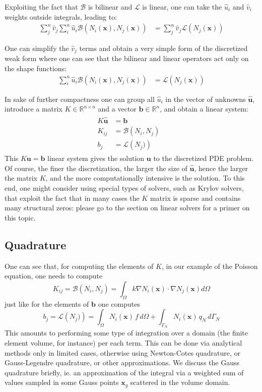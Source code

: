 \documentclass{digitaldynamics}
\def\vect#1{\bm{#1}}
\def\matr#1{{#1}}
\begin{document}
Exploiting the fact that $\mathcal{B}$ is bilinear and $\mathcal{L}$ is linear, one can take the $\hat{u}_i$ and $\hat{v}_i$ weights outside integrals, leading to:
\begin{align}
\sum_j^n \hat{v}_j \sum_i^n \hat{u}_i \mathcal{B}\left(N_i(\vect{x}),N_j(\vect{x})\right) &= \sum_j^n \hat{v}_j \mathcal{L}\left( N_j(\vect{x})\right)
\end{align}

One can simplify the $\hat{v}_j$ terms and obtain a very simple form of the discretized weak form where one can see that the bilinear and linear operators act only on the shape functions:
\begin{align}
\sum_i^n \hat{u}_i \mathcal{B}\left(N_i(\vect{x}),N_j(\vect{x})\right) &= \mathcal{L}\left( N_j(\vect{x})\right)
\end{align}

In sake of further compactness one can group all $\hat{u}_i$ in the vector of unknowns $\hat{\vect{u}}$, introduce a matrix $\matr{K} \in \mathbb{R}^{n\times n}$ and a vector $\vect{b} \in \mathbb{R}^{n}$, and obtain a linear system: 
\begin{align}
\boxed{
\begin{aligned}
\matr{K} \hat{\vect{u}}  &= \vect{b} & \\[2mm]
 K_{ij}   &=  \mathcal{B}\left(N_i,N_j \right) \\
 b_j &=  \mathcal{L}\left( N_j )\right)
\end{aligned}
}
\end{align}
This $\matr{K} \vect{u} = \vect{b}$ linear system gives the solution $\vect{u}$ to the discretized PDE problem. Of course, the finer the discretization, the larger the size of $\hat{\vect{u}}$, hence the larger the matrix $\matr{K}$, and the more computationally intensive is the solution. To this end, one might consider using special types of solvers, such as Krylov solvers, that exploit the fact that in many cases the $\matr{K}$ matrix is sparse and contains many structural zeros: please go to the section on linear solvers for a primer on this topic. 


\subsection{Quadrature}

One can see that, for computing the elements of $\matr{K}$, in our example of the Poisson equation, one needs to compute 
\[
K_{ij}  = \mathcal{B}\left(N_i,N_j \right) = \int_\Omega k \nabla N_i(\vect{x}) \cdot \nabla N_j(\vect{x}) d\Omega
\]
just like for the elements of $\vect{b}$ one computes
\[
b_j  = \mathcal{L}\left( N_j )\right) = \int_\Omega N_i(\vect{x}) \, f \,d\Omega + \int_{\Gamma_N} N_i(\vect{x}) \, q_N \,d\Gamma_N
\]
This amounts to performing some type of integration over a domain (the finite element volume, for instance) per each term. This can be
done via analytical methods only in limited cases, otherwise using Newton-Cotes quadrature, or Gauss-Legendre quadrature, or other approximations. 
We discuss the Gauss quadrature briefly, ie. an approximation of the integral via a weighted sum of values sampled in some Gauss points $\vect{x}_g$ scattered in the volume domain.
\end{document}
